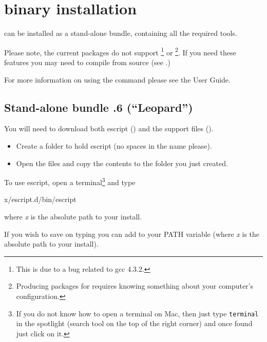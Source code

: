 %
%
%

\section{\macosx binary installation}
\label{sec:binmac}

\esfinley can be installed as a stand-alone bundle, containing all the required tools.

Please note, the current packages do not support \openmp\footnote{This is due to a bug related to gcc 4.3.2.} or \mpi\footnote{Producing packages for \mpi requires knowing something about your computer's configuration.}.
If you need these features you may need to compile \esfinley from source (see .)

For more information on using the  command please see the User Guide.

\subsection{Stand-alone bundle .6 (``Leopard'')}

You will need to download both escript () and the support files ().
\begin{itemize}
\item Create a folder to hold escript (no spaces in the name please).
\item Open the  files and copy the contents to the folder you just created.
\end{itemize}

To use escript, open a terminal\footnote{If you do not know how to open a terminal on Mac, then just type \texttt{terminal} in the spotlight (search tool on the top of the right corner) and once found just click on it.} and type
\begin{shellCode}
x/escript.d/bin/escript
\end{shellCode}
where \textit{x} is the absolute path to your install.

If you wish to save on typing you can add  to your PATH variable (where \textit{x} is the absolute path to your install). 

